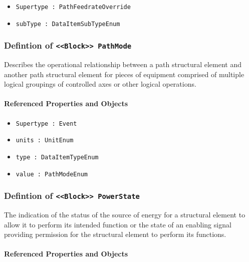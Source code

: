 \begin{itemize}
\item \texttt{Supertype : PathFeedrateOverride}

\item \texttt{subType : DataItemSubTypeEnum}

\end{itemize}
\FloatBarrier
\subsubsection{Defintion of \texttt{<<Block>> PathMode}}
  \label{type:PathMode}

\FloatBarrier

Describes the operational relationship between a path structural element and another path structural element for pieces of equipment comprised of multiple logical groupings of controlled axes or other logical operations.

\FloatBarrier
\paragraph{Referenced Properties and Objects}

\begin{itemize}
\item \texttt{Supertype : Event}

\item \texttt{units : UnitEnum}

\item \texttt{type : DataItemTypeEnum}

\item \texttt{value : PathModeEnum}

\end{itemize}
\FloatBarrier
\subsubsection{Defintion of \texttt{<<Block>> PowerState}}
  \label{type:PowerState}

\FloatBarrier

The indication of the status of the source of energy for a structural element to allow it to perform its intended function or the state of an enabling signal providing permission for the structural element to perform its functions.

\FloatBarrier
\paragraph{Referenced Properties and Objects}

